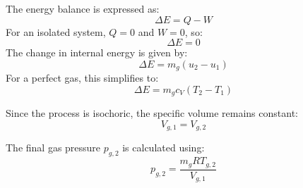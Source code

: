 The energy balance is expressed as:  
\[
\Delta E = Q - W
\]  
For an isolated system, \( Q = 0 \) and \( W = 0 \), so:  
\[
\Delta E = 0
\]  
The change in internal energy is given by:  
\[
\Delta E = m_g (u_2 - u_1)
\]  
For a perfect gas, this simplifies to:  
\[
\Delta E = m_g c_V (T_2 - T_1)
\]  

Since the process is isochoric, the specific volume remains constant:  
\[
V_{g,1} = V_{g,2}
\]  

The final gas pressure \( p_{g,2} \) is calculated using:  
\[
p_{g,2} = \frac{m_g R T_{g,2}}{V_{g,1}}
\]